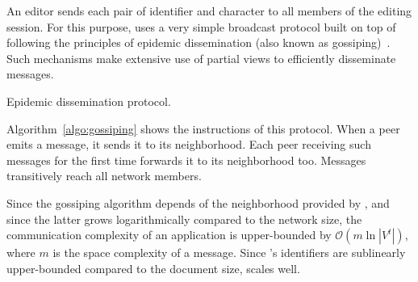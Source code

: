 An editor sends each pair of identifier and character to all members of the
editing session. For this purpose, \CRATE uses a very simple broadcast protocol
built on top of \SPRAY following the principles of epidemic dissemination (also
known as gossiping)~\cite{demers1987epidemic}. Such mechanisms make extensive
use of partial views to efficiently disseminate messages.




\begin{algorithm}[h]
  
  \caption{\label{algo:gossiping}Epidemic dissemination protocol.}
\end{algorithm}

Algorithm~\ref{algo:gossiping} shows the instructions of this protocol. When a
peer emits a message, it sends it to its neighborhood. Each peer receiving such
messages for the first time forwards it to its neighborhood too. Messages
transitively reach all network members.

Since the gossiping algorithm depends of the neighborhood provided by \SPRAY,
and since the latter grows logarithmically compared to the network size, the
communication complexity of an application is upper-bounded by
$\mathcal{O}(m \ln |V^t|)$, where $m$ is the space complexity of a
message. Since \CRATE's identifiers are sublinearly upper-bounded compared to
the document size, \CRATE scales well.

